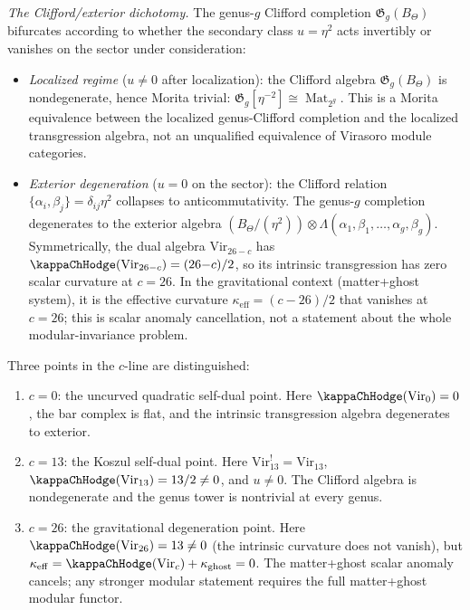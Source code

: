\begin{computation}
\emph{The Clifford/exterior dichotomy.}
The genus-$g$ Clifford completion
$\mathfrak G_g(B_\Theta)$ bifurcates according to
whether the secondary class \(u=\eta^2\) acts invertibly or
vanishes on the sector under consideration:
\begin{itemize}
\item \emph{Localized regime} ($u \neq 0$ after localization):
 the Clifford algebra $\mathfrak G_g(B_\Theta)$ is
 nondegenerate, hence Morita trivial:
 $\mathfrak G_g[\eta^{-2}]\cong
 \operatorname{Mat}_{2^g}$. This is a Morita equivalence between
 the localized genus-Clifford completion and the localized
 transgression algebra, not an unqualified equivalence of Virasoro
 module categories.
\item \emph{Exterior degeneration} ($u = 0$ on the sector):
 the Clifford relation $\{\alpha_i,\beta_j\} =
 \delta_{ij}\eta^2$ collapses to anticommutativity.
 The genus-$g$ completion degenerates to the exterior
 algebra
 \((B_\Theta/(\eta^2))\otimes
 \Lambda(\alpha_1,\beta_1,\dots,\alpha_g,\beta_g)\).
 Symmetrically, the dual algebra
 $\mathrm{Vir}_{26-c}$ has $\kappaChHodge(\mathrm{Vir}_{26-c}) = (26{-}c)/2$, so
 its intrinsic transgression has zero scalar curvature at $c = 26$.
 In the gravitational context (matter+ghost system),
 it is the effective curvature
 $\kappa_{\mathrm{eff}} = (c{-}26)/2$ that vanishes at
 $c = 26$; this is scalar anomaly cancellation, not a statement about
 the whole modular-invariance problem.
\end{itemize}
Three points in the $c$-line are distinguished:
\begin{enumerate}[label=\textup{(\alph*)}]
\item $c = 0$: the uncurved quadratic self-dual point.
 Here $\kappaChHodge(\mathrm{Vir}_0) = 0$, the bar complex
 is flat, and the intrinsic transgression algebra
 degenerates to exterior.
\item $c = 13$: the Koszul self-dual point.
 Here $\mathrm{Vir}_{13}^! = \mathrm{Vir}_{13}$,
 $\kappaChHodge(\mathrm{Vir}_{13}) = 13/2 \neq 0$, and $u \neq 0$. The Clifford
 algebra is nondegenerate and the genus tower is
 nontrivial at every genus.
\item $c = 26$: the gravitational degeneration point.
 Here $\kappaChHodge(\mathrm{Vir}_{26}) = 13 \neq 0$
 (the intrinsic curvature does not vanish), but
 $\kappa_{\mathrm{eff}} = \kappaChHodge(\mathrm{Vir}_c)
 + \kappa_{\mathrm{ghost}} = 0$. The matter+ghost scalar anomaly
 cancels; any stronger modular statement requires the full
 matter+ghost modular functor.
\end{enumerate}


\end{computation}
